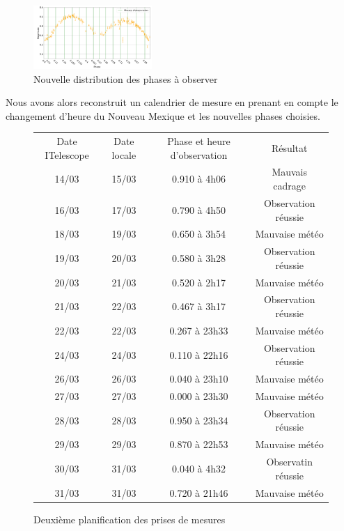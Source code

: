\documentclass[10pt,french, openany]{book}
\begin{document}
\newpage
\begin{figure}[h!]
    \centering
    \includegraphics[width=0.4\textwidth]{Lumin+phase2.png}
    \caption{Nouvelle distribution des phases à observer}
    \label{fig:my_label}
\end{figure}

Nous avons alors reconstruit un calendrier de mesure en prenant en compte le changement d'heure du Nouveau Mexique et les nouvelles phases choisies. 

\begin{figure}[h!]
    \centering
    \begin{tabular}{|c|c|c|c|}\hline
     Date ITelescope & Date locale & Phase et heure d'observation & Résultat \\ \hhline{|=|=|=|=|}
     14/03 & 15/03 & 0.910 à 4h06 & Mauvais cadrage \\ \hline
     16/03 & 17/03 & 0.790 à 4h50 & Observation réussie\\ \hline
     18/03 & 19/03 & 0.650 à 3h54 & Mauvaise météo\\ \hline
     19/03 & 20/03 & 0.580 à 3h28 & Observation réussie\\ \hline
     20/03 & 21/03 & 0.520 à 2h17 & Mauvaise météo \\ \hline
     21/03 & 22/03 & 0.467 à 3h17 & Observation réussie\\ \hline
     22/03 & 22/03 & 0.267 à 23h33 & Mauvaise météo\\ \hline
     24/03 & 24/03 & 0.110 à 22h16 & Observation réussie\\ \hline
     26/03 & 26/03 & 0.040 à 23h10 & Mauvaise météo\\ \hline
     27/03 & 27/03 & 0.000 à 23h30 & Mauvaise météo\\ \hline
     28/03 & 28/03 & 0.950 à 23h34 & Observation réussie\\ \hline
     29/03 & 29/03 & 0.870 à 22h53 & Mauvaise météo\\ \hline
     30/03 & 31/03 & 0.040 à 4h32 & Observatin réussie\\ \hline
     31/03 & 31/03 & 0.720 à 21h46 & Mauvaise météo\\ \hline
    \end{tabular}
    \caption{Deuxième planification des prises de mesures}
    \label{fig:my_label}
\end{figure}
\end{document}

